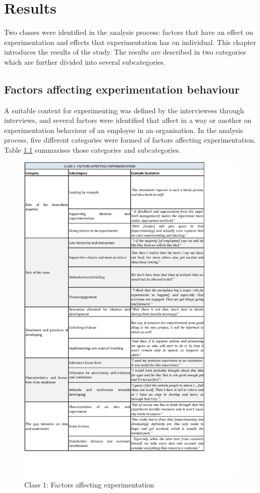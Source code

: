 \chapter{Results} \label{results}
Two classes were identified in the analysis process: factors that have an effect on experimentation and effects that experimentation has on individual. This chapter introduces the results of the study. The results are described in two categories which are further divided into several subcategories. 

\section{Factors affecting experimentation behaviour}
A suitable context for experimenting was defined by the interviewees through interviews, and several factors were identified that affect in a way or another on experimentation behaviour of an employee in an organisation. In the analysis process, five different categories were formed of factors affecting experimentation. Table \ref{tbl:class1} summarises those categories and subcategories. 

\begin{figure}[!H]
\vspace{-20pt}
\hspace{-25pt}
\includegraphics{class1.pdf}
\vspace{-80pt}
\caption{Class 1: Factors affecting experimentation}
\label{tbl:class1}
\end{figure}


